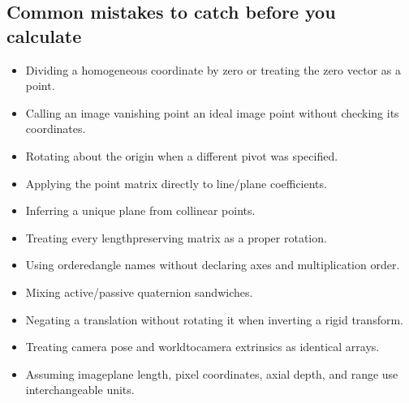 \documentclass[letterpaper,11pt,english,openany,oneside]{jupyterBook}
\begin{document}
\subsection{Common mistakes to catch before you calculate}
\label{\detokenize{lectures/lecture01/review:common-mistakes-to-catch-before-you-calculate}}\begin{itemize}
\item {}
\sphinxAtStartPar
Dividing a homogeneous coordinate by zero or treating the zero vector as a point.

\item {}
\sphinxAtStartPar
Calling an image vanishing point an ideal image point without checking its coordinates.

\item {}
\sphinxAtStartPar
Rotating about the origin when a different pivot was specified.

\item {}
\sphinxAtStartPar
Applying the point matrix directly to line/plane coefficients.

\item {}
\sphinxAtStartPar
Inferring a unique plane from collinear points.

\item {}
\sphinxAtStartPar
Treating every length\sphinxhyphen{}preserving matrix as a proper rotation.

\item {}
\sphinxAtStartPar
Using ordered\sphinxhyphen{}angle names without declaring axes and multiplication order.

\item {}
\sphinxAtStartPar
Mixing active/passive quaternion sandwiches.

\item {}
\sphinxAtStartPar
Negating a translation without rotating it when inverting a rigid transform.

\item {}
\sphinxAtStartPar
Treating camera pose and world\sphinxhyphen{}to\sphinxhyphen{}camera extrinsics as identical arrays.

\item {}
\sphinxAtStartPar
Assuming image\sphinxhyphen{}plane length, pixel coordinates, axial depth, and range use interchangeable units.

\end{itemize}
\end{document}
